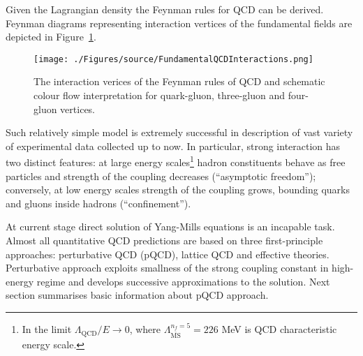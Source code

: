 Given the Lagrangian density the Feynman rules for QCD can be derived.  Feynman diagrams representing interaction vertices of the fundamental fields are depicted in Figure~\ref{fig:FundamentalQCDInteractions}.
\begin{figure}[t]
	\centering
		\texttt{[image: ./Figures/source/FundamentalQCDInteractions.png]}
	\caption{The interaction verices of the Feynman rules of QCD and schematic colour flow interpretation for quark-gluon, three-gluon and four-gluon vertices.}
	\label{fig:FundamentalQCDInteractions}
\end{figure}

Such relatively simple model is extremely successful in description of vast variety of experimental data collected up to now. In particular, strong interaction has two distinct features: at large energy scales\footnote{In the limit $\Lambda_\mathrm{QCD}/E\rightarrow 0$, where $\Lambda^{n_f=5}_{\overline{\mathrm{MS}}}=226$ MeV is QCD characteristic energy scale.} hadron constituents behave as free particles and strength of the coupling decreases (``asymptotic freedom''); conversely, at low energy scales strength of the coupling grows, bounding quarks and gluons inside hadrons (``confinement'').  
 
At current stage direct solution of Yang-Mills equations is an incapable task. Almost all quantitative QCD predictions are based on three first-principle approaches: perturbative QCD (pQCD), lattice QCD and effective theories. Perturbative approach exploits smallness of the strong coupling constant in high-energy regime and develops successive approximations to the solution. Next section summarises basic information about pQCD approach.

